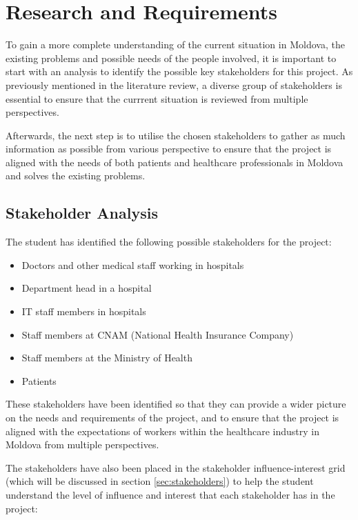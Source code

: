 \chapter{Research and Requirements}

To gain a more complete understanding of the current situation in Moldova, the existing problems and possible needs of the people involved, it is important to start with an analysis to identify the possible key stakeholders for this project. As previously mentioned in the literature review, a diverse group of stakeholders is essential to ensure that the currrent situation is reviewed from multiple perspectives. 

Afterwards, the next step is to utilise the chosen stakeholders to gather as much information as possible from various perspective to ensure that the project is aligned with the needs of both patients and healthcare professionals in Moldova and solves the existing problems.

\section{Stakeholder Analysis}

The student has identified the following possible stakeholders for the project:

\begin{itemize}
    \item Doctors and other medical staff working in hospitals
    \item Department head in a hospital
    \item IT staff members in hospitals
    \item Staff members at CNAM (National Health Insurance Company)
    \item Staff members at the Ministry of Health 
    \item Patients 
\end{itemize}

These stakeholders have been identified so that they can provide a wider picture on the needs and requirements of the project, and to ensure that the project is aligned with the expectations of workers within the healthcare industry in Moldova from multiple perspectives. 

The stakeholders have also been placed in the stakeholder influence-interest grid (which will be discussed in section \ref{sec:stakeholders}) to help the student understand the level of influence and interest that each stakeholder has in the project:

